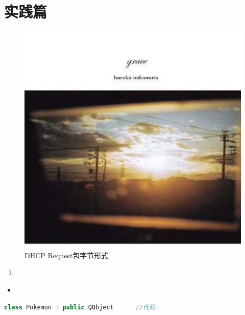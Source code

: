 \documentclass[a4paper, 14pt, oneside]{book} %
\numberwithin{equation}{subsection}
\begin{document}
	\section{实践篇}
	
	\begin{figure}[H]
		\centering  
		\includegraphics[scale=0.7]{img/avatar.jpg}   
		\caption{DHCP Request包字节形式}
	\end{figure}

	\begin{enumerate}
		\item 
	\end{enumerate}

	\begin{itemize}
		\item 
	\end{itemize}

	\begin{lstlisting}[language={C++}]
	class Pokemon : public QObject  	//代码
	\end{lstlisting}
	
\end{document}
